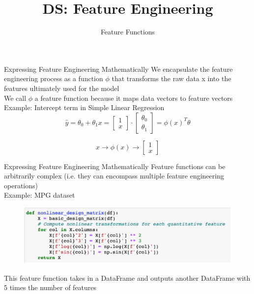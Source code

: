 \documentclass[aspectratio=169]{../latex_main/tntbeamer}  %
\title[Introduction]{DS: Feature Engineering}
\subtitle{Feature Functions}
\begin{document}
	
	\maketitle
	\begin{frame}{Expressing Feature Engineering Mathematically}
	    We encapsulate the feature engineering process as a function $\phi$ that transforms the raw data x into the features ultimately used for the model\\
	    \bigskip
	    We call $\phi$ a feature function because it maps data vectors to feature vectors\\
	    \bigskip
	    Example: Intercept term in Simple Linear Regression
        \begin{equation*}
            \hat{y} = \theta_0 + \theta_1x = \left[\begin{array}{c}
                 1\\
                 x
            \end{array}\right] \cdot \left[\begin{array}{c}
                 \theta_0\\
                 \theta_1
            \end{array}\right] = \phi(x)^T\theta
        \end{equation*}
        
        \begin{equation*}
            x \rightarrow \phi (x) \rightarrow \left[\begin{array}{c}
                 1\\
                 x
            \end{array}\right]
        \end{equation*}
	\end{frame}
	
	
	\begin{frame}{Expressing Feature Engineering Mathematically}
	    Feature functions can be arbitrarily complex (i.e. they can encompass multiple feature engineering operations)\\
	    \bigskip
	    Example: MPG dataset
        \begin{figure}
            \centering
            \includegraphics[scale=.4]{Bild7}
        \end{figure}
        This feature function takes in a DataFrame and outputs another DataFrame with 5 times the number of features
	\end{frame}
	
\end{document}
